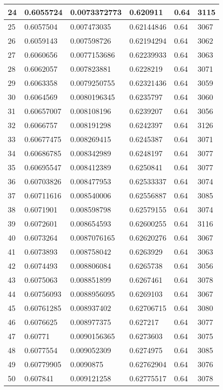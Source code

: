 \begin{longtable}{|l|l|l|l|l|l|}
24 & 0.6055724 & 0.0073372773 & 0.620911 & 0.64 & 3115 \\ \hline 
25 & 0.6057504 & 0.007473035 & 0.62144846 & 0.64 & 3067 \\ \hline 
26 & 0.6059143 & 0.007598726 & 0.62194294 & 0.64 & 3062 \\ \hline 
27 & 0.6060656 & 0.0077153686 & 0.62239933 & 0.64 & 3063 \\ \hline 
28 & 0.6062057 & 0.007823881 & 0.6228219 & 0.64 & 3071 \\ \hline 
29 & 0.6063358 & 0.0079250755 & 0.62321436 & 0.64 & 3059 \\ \hline 
30 & 0.6064569 & 0.0080196345 & 0.6235797 & 0.64 & 3060 \\ \hline 
31 & 0.60657007 & 0.008108196 & 0.6239207 & 0.64 & 3056 \\ \hline 
32 & 0.6066757 & 0.008191298 & 0.6242397 & 0.64 & 3126 \\ \hline 
33 & 0.60677475 & 0.008269415 & 0.6245387 & 0.64 & 3071 \\ \hline 
34 & 0.60686785 & 0.008342989 & 0.6248197 & 0.64 & 3077 \\ \hline 
35 & 0.60695547 & 0.008412389 & 0.6250841 & 0.64 & 3077 \\ \hline 
36 & 0.60703826 & 0.008477953 & 0.62533337 & 0.64 & 3074 \\ \hline 
37 & 0.60711616 & 0.008540006 & 0.62556887 & 0.64 & 3085 \\ \hline 
38 & 0.6071901 & 0.008598798 & 0.62579155 & 0.64 & 3074 \\ \hline 
39 & 0.6072601 & 0.008654593 & 0.62600255 & 0.64 & 3116 \\ \hline 
40 & 0.6073264 & 0.0087076165 & 0.62620276 & 0.64 & 3067 \\ \hline 
41 & 0.6073893 & 0.008758042 & 0.6263929 & 0.64 & 3063 \\ \hline 
42 & 0.6074493 & 0.008806084 & 0.6265738 & 0.64 & 3056 \\ \hline 
43 & 0.6075063 & 0.008851899 & 0.6267461 & 0.64 & 3078 \\ \hline 
44 & 0.60756093 & 0.0088956095 & 0.6269103 & 0.64 & 3067 \\ \hline 
45 & 0.60761285 & 0.008937402 & 0.62706715 & 0.64 & 3080 \\ \hline 
46 & 0.6076625 & 0.008977375 & 0.627217 & 0.64 & 3077 \\ \hline 
47 & 0.60771 & 0.0090156365 & 0.6273603 & 0.64 & 3075 \\ \hline 
48 & 0.6077554 & 0.009052309 & 0.6274975 & 0.64 & 3085 \\ \hline 
49 & 0.60779905 & 0.0090875 & 0.62762904 & 0.64 & 3076 \\ \hline 
50 & 0.607841 & 0.009121258 & 0.62775517 & 0.64 & 3078 \\ \hline 
\end{longtable}